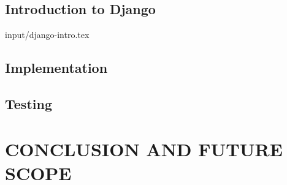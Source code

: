 \documentclass[12pt]{report}
\begin{document}
\section{Introduction to Django}                                        
 {input/django-intro.tex}   
%

%
%


\section{Implementation}                                                

\newpage
\section{Testing}                                                




%
%
%
\chapter{CONCLUSION AND FUTURE SCOPE}


%
%
%
%
%

\end{document}
